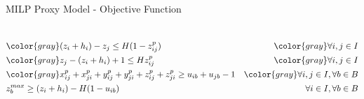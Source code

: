 \documentclass{beamer}
\begin{document}
\begin{frame}{MILP Proxy Model - Objective Function}
\begin{columns}[onlytextwidth,T]
{\begin{minipage}{\linewidth}
\begin{align}
                                         & \color{gray} (z_i + h_i) - z_j\le H(1 - z^p_{ij})                                                     & \color{gray} \forall i,j \in I \notag \\
                                         & \color{gray} z_j - (z_i + h_i) + 1 \le H z^p_{ij}                                                     & \color{gray} \forall i,j \in I \notag \\
                                         & \color{gray} x^p_{ij} + x^p_{ji} + y^p_{ij} + y^p_{ji} + z^p_{ij} + z^p_{ji} \ge u_{ib} + u_{jb} - 1  & \color{gray} \forall i,j \in I, \forall b \in B \notag \\
                                         & z^{max}_b \ge (z_i + h_i) - H(1-u_{ib})                                                               & \forall i \in I, \forall b \in B \notag
                    \end{align}
                \end{minipage}
            }
            \end{columns}
    \end{frame}
\end{document}
